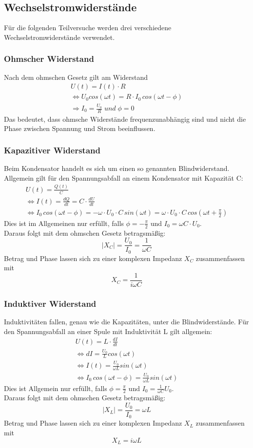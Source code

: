 \documentclass[a4paper, 11pt]{article}
\begin{document}
\subsection{Wechselstromwiderstände}
Für die folgenden Teilversuche werden drei verschiedene Wechselstromwiderstände verwendet.
\subsubsection{Ohmscher Widerstand}
Nach dem ohmschen Gesetz gilt am Widerstand
\begin{gather*}
U(t) = I(t) \cdot R \\
\Leftrightarrow U_0 cos (\omega t) = R \cdot I_0 \,cos(\omega t - \phi) \\
\Rightarrow I_0 = \frac{U_0}{R} \; und \; \phi = 0
\end{gather*}
Das bedeutet, dass ohmsche Widerstände frequenzunabhängig sind und nicht die Phase zwischen Spannung und Strom beeinflussen.

\subsubsection{Kapazitiver Widerstand}
Beim Kondensator handelt es sich um einen so genannten Blindwiderstand. Allgemein gilt für den Spannungsabfall an einem Kondensator mit Kapazität C: 
\begin{gather*} 
U(t) = \frac{Q(t)}{C} \\
\Leftrightarrow I(t) = \frac{dQ}{dt} = C \cdot \frac{dU}{dt} \\
\Leftrightarrow I_0 \, cos(\omega t - \phi) = - \omega \cdot U_0 \cdot C \, sin(\omega t) = \omega \cdot U_0 \cdot C \, cos(\omega t + \frac{\pi}{2}) 
\end{gather*}
Dies ist im Allgemeinen nur erfüllt, falls $\phi = - \frac{\pi}{2}$ und $I_0 = \omega C \cdot U_0 $.\\
Daraus folgt mit dem ohmschen Gesetz betragsmäßig: \[|X_C| = \frac{U_0}{I_0} = \frac{1}{\omega C}\]
Betrag und Phase lassen sich zu einer komplexen Impedanz $X_C$ zusammenfassen mit \[ X_C = \frac{1}{i \omega C}\]

\subsubsection{Induktiver Widerstand}
Induktivitäten fallen, genau wie die Kapazitäten, unter die Blindwiderstände. Für den Spannungsabfall an einer Spule mit Induktivität L gilt allgemein:
\begin{gather*}
U(t) = L \cdot \frac{dI}{dt} \\
\Leftrightarrow dI =  \frac{U_0}{L} cos(\omega	t) \\
\Leftrightarrow I(t) = \frac{U_0}{\omega L} sin(\omega t) \\
\Leftrightarrow I_0 \, cos(\omega	t - \phi) = \frac{U_0}{\omega L} sin(\omega t) 
\end{gather*}
Dies ist Allgemein nur erfüllt, falls $\phi = \frac{\pi}{2}$ und $I_0 = \frac{1}{\omega C} U_0$.\\
Daraus folgt mit dem ohmschen Gesetz betragsmäßig: \[|X_L| = \frac{U_0}{I_0} = \omega L \]
Betrag und Phase lassen sich zu einer komplexen Impedanz $X_L$ zusammenfassen mit \[ X_L = i \omega L \]
\end{document}
